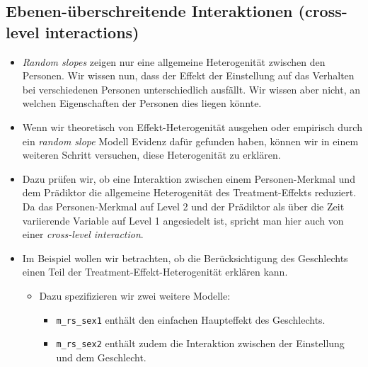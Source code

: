 \documentclass[
]{book}
\providecommand{\tightlist}{%
  \setlength{\itemsep}{0pt}\setlength{\parskip}{0pt}}
\begin{document}
\hypertarget{ebenen-uxfcberschreitende-interaktionen-cross-level-interactions}{%
\subsection*{Ebenen-überschreitende Interaktionen (cross-level interactions)}\label{ebenen-uxfcberschreitende-interaktionen-cross-level-interactions}}

\begin{itemize}
\item
  \emph{Random slopes} zeigen nur eine allgemeine Heterogenität zwischen den Personen. Wir wissen nun, dass der Effekt der Einstellung auf das Verhalten bei verschiedenen Personen unterschiedlich ausfällt. Wir wissen aber nicht, an welchen Eigenschaften der Personen dies liegen könnte.
\item
  Wenn wir theoretisch von Effekt-Heterogenität ausgehen oder empirisch durch ein \emph{random slope} Modell Evidenz dafür gefunden haben, können wir in einem weiteren Schritt versuchen, diese Heterogenität zu erklären.
\item
  Dazu prüfen wir, ob eine Interaktion zwischen einem Personen-Merkmal und dem Prädiktor die allgemeine Heterogenität des Treatment-Effekts reduziert. Da das Personen-Merkmal auf Level 2 und der Prädiktor als über die Zeit variierende Variable auf Level 1 angesiedelt ist, spricht man hier auch von einer \emph{cross-level interaction}.
\item
  Im Beispiel wollen wir betrachten, ob die Berücksichtigung des Geschlechts einen Teil der Treatment-Effekt-Heterogenität erklären kann.

  \begin{itemize}
  \tightlist
  \item
    Dazu spezifizieren wir zwei weitere Modelle:

    \begin{itemize}
    \tightlist
    \item
      \texttt{m\_rs\_sex1} enthält den einfachen Haupteffekt des Geschlechts.
    \item
      \texttt{m\_rs\_sex2} enthält zudem die Interaktion zwischen der Einstellung und dem Geschlecht.
    \end{itemize}
  \end{itemize}
\end{itemize}
\end{document}
